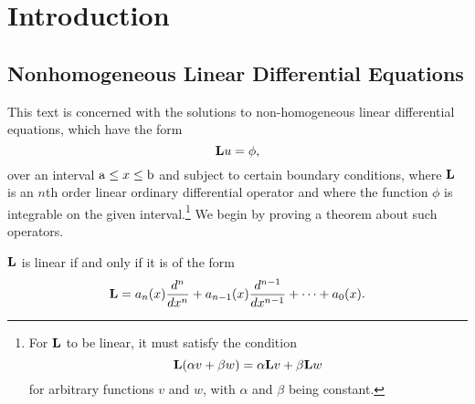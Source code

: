 \section{Introduction}
\subsection{Nonhomogeneous Linear Differential Equations}
This text is concerned with the solutions to non-homogeneous linear differential equations, which have the form
\begin{equation}
    \mathrm{\bf{L}} u=\phi,
\end{equation}
over an interval \(\mathrm{a} \leq x \leq \mathrm{b}\) and subject to certain boundary conditions, where \(\mathrm{\bf{L}}\) is an \(n\)th order linear ordinary differential operator and where the function \(\phi\) is integrable on the given interval.\footnote{For \(\mathrm{\bf{L}}\) to be linear, it must satisfy the condition
\begin{equation}\label{eq:linearity}
	\mathrm{\bf{L}}(\alpha v + \beta w) = \alpha \mathrm{\bf{L}} v + \beta \mathrm{\bf{L}} w
\end{equation}
for arbitrary functions \(v\) and \(w\), with \(\alpha\) and \(\beta\) being constant.}
We begin by proving a theorem about such operators.


\begin{theorem}
	\(\mathrm{\bf{L}}\) is linear if and only if it is of the form
	\begin{equation} 
		\mathrm{\bf{L}} = a_n(x) \frac{d^n}{dx^n} + a_{n-1}(x) \frac{d^{n-1}}{dx^{n-1}} + \cdots + a_0(x).
	\end{equation}
\end{theorem}

